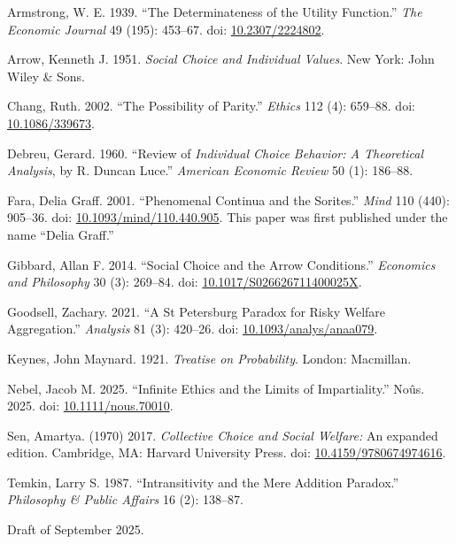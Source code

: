 \documentclass[
  11pt,
  letterpaper,
  DIV=11,
  numbers=noendperiod,
  twoside]{scrartcl}
\newlength{\cslhangindent}
\newenvironment{CSLReferences}[2] %
 {\begin{list}{}{%
  \setlength{\itemindent}{0pt}
  \setlength{\leftmargin}{0pt}
  \setlength{\parsep}{0pt}
  \ifodd #1
   \setlength{\leftmargin}{\cslhangindent}
   \setlength{\itemindent}{-1\cslhangindent}
  \fi
  \setlength{\itemsep}{#2\baselineskip}}}
 {\end{list}}
\begin{document}
\label{refs}
\begin{CSLReferences}{1}{0}
Armstrong, W. E. 1939. {``The Determinateness of the Utility
Function.''} \emph{The Economic Journal} 49 (195): 453--67. doi:
\href{https://doi.org/10.2307/2224802}{10.2307/2224802}.

Arrow, Kenneth J. 1951. \emph{Social Choice and Individual Values}. New
York: John Wiley \& Sons.

Chang, Ruth. 2002. {``The Possibility of Parity.''} \emph{Ethics} 112
(4): 659--88. doi:
\href{https://doi.org/10.1086/339673}{10.1086/339673}.

Debreu, Gerard. 1960. {``Review of \emph{Individual Choice Behavior: A
Theoretical Analysis}, by {R. Duncan Luce}.''} \emph{American Economic
Review} 50 (1): 186--88.

Fara, Delia Graff. 2001. {``Phenomenal Continua and the Sorites.''}
\emph{Mind} 110 (440): 905--36. doi:
\href{https://doi.org/10.1093/mind/110.440.905}{10.1093/mind/110.440.905}.
This paper was first published under the name {``Delia Graff.''}

Gibbard, Allan F. 2014. {``Social Choice and the Arrow Conditions.''}
\emph{Economics and Philosophy} 30 (3): 269--84. doi:
\href{https://doi.org/10.1017/S026626711400025X}{10.1017/S026626711400025X}.

Goodsell, Zachary. 2021. {``A St Petersburg Paradox for Risky Welfare
Aggregation.''} \emph{Analysis} 81 (3): 420--26. doi:
\href{https://doi.org/10.1093/analys/anaa079}{10.1093/analys/anaa079}.

Keynes, John Maynard. 1921. \emph{Treatise on Probability}. London:
Macmillan.

Nebel, Jacob M. 2025. {``Infinite Ethics and the Limits of
Impartiality.''} No{û}s. 2025. doi:
\href{https://doi.org/10.1111/nous.70010}{10.1111/nous.70010}.

Sen, Amartya. (1970) 2017. \emph{Collective Choice and Social Welfare:}
An expanded edition. Cambridge, MA: Harvard University Press. doi:
\href{https://doi.org/10.4159/9780674974616}{10.4159/9780674974616}.

Temkin, Larry S. 1987. {``Intransitivity and the Mere Addition
Paradox.''} \emph{Philosophy \& Public Affairs} 16 (2): 138--87.

\end{CSLReferences}



Draft of September 2025.
\end{document}
